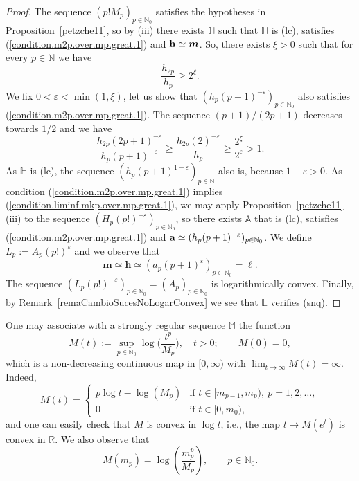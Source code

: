 \documentclass[11pt,a4paper]{article}
\theoremstyle{definition}
\def\ep{\varepsilon}
\def\bl{\boldsymbol{\ell}}
\def\N{\mathbb{N}}
\def\H{\mathbb{H}}
\def\bM{\mathbb{M}}%
\def\A{\mathbb{A}} %
\def\m{\boldsymbol{m}}
\def\h{\boldsymbol{h}}
\begin{document}
\begin{proof}
The sequence $ (p! M_p )_{p\in\N_0}$ satisfies the hypotheses in Proposition~\ref{petzche11}, so by (iii) there exists $\mathbb{H}$ such
that $\H$ is (lc), satisfies (\ref{condition.m2p.over.mp.great.1}) and $ \bf{h} \simeq \m $. So, there exists $\xi>0$ such that for every $p\in\N$ we have
$$\frac{h_{2p}}{ h_p} \geq 2^{\xi}.$$
We fix $0<\ep<\min(1,\xi)$, let us show that $(h_p (p+1)^{-\ep})_{p\in\N_0}$ also satisfies (\ref{condition.m2p.over.mp.great.1}).
The sequence $(p+1)/(2p+1)$ decreases towards $1/2$ and we have
$$\frac{h_{2p}(2p+1)^{-\ep}}{h_p (p+1)^{-\ep}} \geq \frac{h_{2p}(2)^{-\ep}}{h_p} \geq \frac{2^\xi}{2^\ep}>1.  $$
As $\H$ is (lc), the
sequence $(h_p (p+1)^{1-\ep})_{p\in\N}$ also is, because $1-\ep>0$. As
condition (\ref{condition.m2p.over.mp.great.1}) implies (\ref{condition.liminf.mkp.over.mp.great.1}), we may apply Proposition~\ref{petzche11}(iii) to the sequence $(H_p (p!)^{-\ep})_{p\in\N_0}$, so there exists $\A$ that is (lc), satisfies (\ref{condition.m2p.over.mp.great.1})
and ${\bf a} \simeq (h_p (p+1)^{-\ep})_{p\in\N_0} $. We define $L_p:= A_p (p!)^{\ep}$ and we observe that
$$\m \simeq \h \simeq (a_p (p+1)^{\ep})_{p \in \N_0} = \bl. $$
The sequence $(L_p (p!)^{-\ep})_{p\in\N_0} =( A_p)_{p\in\N_0} $ is logarithmically convex. Finally, by Remark~\ref{remaCambioSucesNoLogarConvex} we see
that $\mathbb{L}$ verifies (snq).
\end{proof}




One may associate with a strongly regular sequence $\bM$ the function
\begin{equation}\label{equadefiMdet}
M(t):=\sup_{p\in\N_{0}}\log\big(\frac{t^p}{M_{p}}\big),\quad t>0;\qquad M(0)=0,
\end{equation}
which is a non-decreasing continuous map in $[0,\infty)$ with $\lim_{t\to\infty}M(t)=\infty$.
Indeed,
\begin{equation*}%
M(t)=\left \{ \begin{matrix}  p\log t -\log(M_{p}) & \mbox{if }t\in [m_{p-1},m_{p}),\ p=1,2,\ldots,\\
0 & \mbox{if } t\in [0,m_{0}), \end{matrix}\right.
\end{equation*}
and one can easily check that $M$ is convex in $\log t$, i.e., the map $t\mapsto M(e^t)$ is convex in $\mathbb{R}$.
We also observe that
\begin{equation}
 M(m_p)=\log \left( \frac{m^p_p}{M_p}\right), \qquad p\in \N_0. \label{equation.M.in.mp}
\end{equation}
\end{document}
